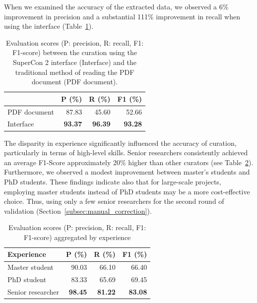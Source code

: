 \documentclass[a4paper]{article}
\begin{document}
When we examined the accuracy of the extracted data, we observed a 6\% improvement in precision and a substantial 111\% improvement in recall when using the interface (Table~\ref{tab:evaluation-interface-correction}). 

\begin{table}[ht]
\centering\small
\caption{Evaluation scores (P: precision, R: recall, F1: F1-score) between the curation using the SuperCon 2 interface (Interface) and the traditional method of reading the PDF document (PDF document). }
\begin{tabular}{lrrr}
\toprule
                    & \textbf{P (\%)}   & \textbf{R (\%)}   & \textbf{F1 (\%)}  \\
    \midrule
    PDF document    & 87.83             & 45.60             & 52.66             \\
    Interface       & \textbf{93.37}    & \textbf{96.39}    & \textbf{93.28}    \\
    \bottomrule
\end{tabular}
\label{tab:evaluation-interface-correction}
\end{table}

The disparity in experience significantly influenced the accuracy of curation, particularly in terms of high-level skills. Senior researchers consistently achieved an average F1-Score approximately 20\% higher than other curators (see Table~\ref{tab:accuracy-by-experience}). Furthermore, we observed a modest improvement between master's students and PhD students. These findings indicate also that for large-scale projects, employing master students instead of PhD students may be a more cost-effective choice. Thus, using only a few senior researchers for the second round of validation (Section~\ref{subsec:manual_correction}).

\begin{table}[h]
\centering
\caption{Evaluation scores (P: precision, R: recall, F1: F1-score) aggregated by experience}
\begin{tabular}{lrrr}
\toprule
\textbf{Experience} & \textbf{P (\%)}   & \textbf{R (\%)}   & \textbf{F1 (\%)}  \\
\midrule
Master student      & 90.03             & 66.10             & 66.40             \\
PhD student         & 83.33             & 65.69             & 69.45             \\
Senior researcher   & \textbf{98.45}    & \textbf{81.22}    & \textbf{83.08}    \\
\bottomrule
\end{tabular}
\label{tab:accuracy-by-experience}
\end{table}
\end{document}
